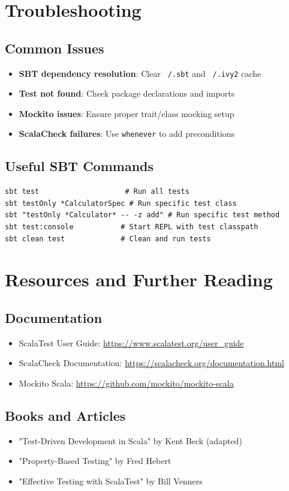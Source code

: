 \documentclass[12pt,a4paper]{article}
\begin{document}
\section{Troubleshooting}

\subsection{Common Issues}
\begin{itemize}
  \item \textbf{SBT dependency resolution}: Clear \texttt{~/.sbt} and \texttt{~/.ivy2} cache
  \item \textbf{Test not found}: Check package declarations and imports
  \item \textbf{Mockito issues}: Ensure proper trait/class mocking setup
  \item \textbf{ScalaCheck failures}: Use \texttt{whenever} to add preconditions
\end{itemize}

\subsection{Useful SBT Commands}
\begin{lstlisting}
sbt test                    # Run all tests
sbt testOnly *CalculatorSpec # Run specific test class
sbt "testOnly *Calculator* -- -z add" # Run specific test method
sbt test:console           # Start REPL with test classpath
sbt clean test             # Clean and run tests
\end{lstlisting}

\section{Resources and Further Reading}

\subsection{Documentation}
\begin{itemize}
  \item ScalaTest User Guide: \url{https://www.scalatest.org/user_guide}
  \item ScalaCheck Documentation: \url{https://scalacheck.org/documentation.html}
  \item Mockito Scala: \url{https://github.com/mockito/mockito-scala}
\end{itemize}

\subsection{Books and Articles}
\begin{itemize}
  \item "Test-Driven Development in Scala" by Kent Beck (adapted)
  \item "Property-Based Testing" by Fred Hebert
  \item "Effective Testing with ScalaTest" by Bill Venners
\end{itemize}
\end{document}
